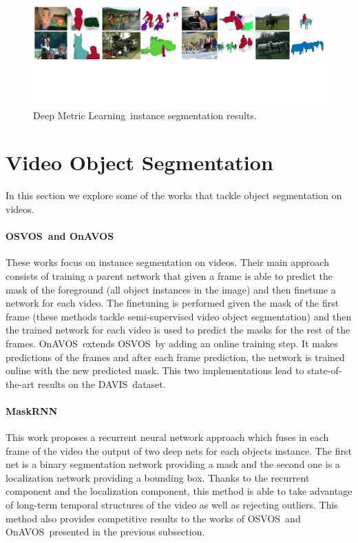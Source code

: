 \begin{figure}[h]
  \centering
  \includegraphics[width=1.\linewidth]{figures/deep_metric_learning/mask_classification.pdf}
  \caption{Deep Metric Learning~\deepml instance segmentation results. }
  \label{fig:deep_metric_learning}
\end{figure}

\section{Video Object Segmentation}
\label{sec:soa:videoobjectsegmentation}

In this section we explore some of the works that tackle object segmentation on videos.

\paragraph{OSVOS~\osvos and OnAVOS~\onavos}
These works focus on instance segmentation on videos.
Their main approach consists of training a parent network that given a frame is able to predict the mask of the foreground (all object instances in the image) and then finetune a network for each video.
The finetuning is performed given the mask of the first frame (these methods tackle semi-supervised video object segmentation) and then the trained network for each video is used to predict the masks for the rest of the frames.
OnAVOS~\onavos extends OSVOS~\osvos by adding an online training step.
It makes predictions of the frames and after each frame prediction, the network is trained online with the new predicted mask.
This two implementations lead to state-of-the-art results on the DAVIS~\davisboth dataset.

\paragraph{MaskRNN~\maskrnn}
This work proposes a recurrent neural network approach which fuses in each frame of the video the output of two deep nets for each objects instance.
The first net is a binary segmentation network providing a mask and the second one is a localization network providing a bounding box.
Thanks to the recurrent component and the localization component, this method is able to take advantage of long-term temporal structures of the video as well as rejecting outliers.
This method also provides competitive results to the works of OSVOS~\osvos and OnAVOS~\onavos presented in the previous subsection.

